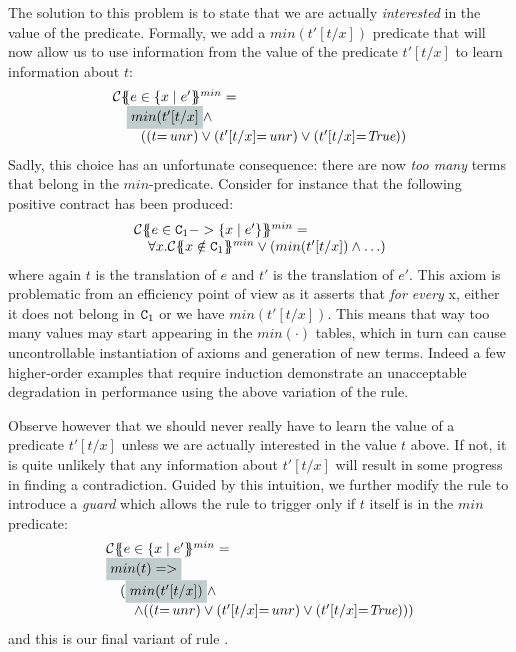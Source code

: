 The solution to this problem is to state that we are actually {\em interested} in the value of the predicate. Formally,
we add a $min(t'[t/x])$ predicate that will now allow us to use information from the value of the predicate $t'[t/x]$
to learn information about $t$:
\[\begin{array}{l}    \ctransmin{}{\Gamma}{e \in \{ x \mid e' } = \\
   \quad \highlight{min(t'[t/x]} \land \\
   \quad \quad ((t{=}\unr) \lor (t'[t/x]{=}\unr) \lor (t'[t/x]{=}\True))
\end{array}\]
Sadly, this choice has an unfortunate consequence: there are now {\em too many} terms that belong in
the $min$-predicate. Consider for instance that the following positive contract has been produced:
\[\begin{array}{l}
    \ctransmin{}{\Gamma}{e \in \Ct_1 -> \{x \mid e'\}} = \\
        \quad \forall x. \ctransmin{}{\Gamma}{x \notin \Ct_1} \lor (min(t'[t/x]) \land \ldots )
\end{array}\]
where again $t$ is the translation of $e$ and $t'$ is the translation of $e'$. This axiom is problematic
from an efficiency point of view as it asserts that {\em for every} x, either it does not belong in ${\tt C}_1$
or we have $min(t'[t/x])$. This means that way too many values may start appearing in the $min(\cdot)$ tables,
which in turn can cause uncontrollable instantiation of axioms and generation of new terms.
Indeed a few higher-order examples that require induction demonstrate an unacceptable
degradation in performance using the above variation of the rule.

Observe however that we should never really have to learn the value of a predicate $t'[t/x]$ unless we
are actually interested in the value $t$ above. If not, it is quite unlikely that any information about
$t'[t/x]$ will result in some progress in finding a contradiction. Guided by this intuition, we further modify
the rule  to introduce a {\em guard} which allows the rule to trigger only if $t$ itself is
in the $min$ predicate:
\[\begin{array}{l}
    \ctransmin{}{\Gamma}{e \in \{ x \mid e' } = \\
    \highlight{min(t) => } \\
    \quad (\highlight{min(t'[t/x])} \land \\
    \quad\quad \land ((t{=}\unr) \lor (t'[t/x]{=}\unr) \lor (t'[t/x]{=}\True)))
\end{array} \]
and this is our final variant of rule .

